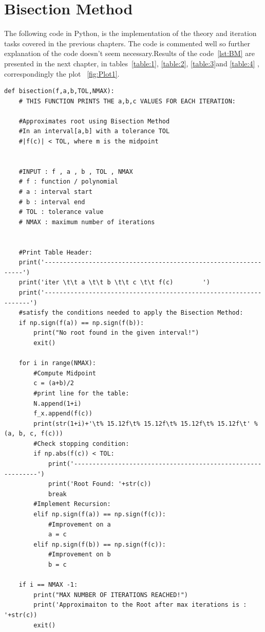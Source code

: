 \documentclass[a4paper, 12pt]{report}
\begin{document}
\section{Bisection Method}
The following code in Python, is the implementation of the theory and iteration tasks covered in the previous chapters. The code is commented well so further explanation of the code doesn't seem necessary.Results of the code~\ref{lst:BM} are presented in the next chapter, in tables~\ref{table:1}, \ref{table:2}, \ref{table:3}and \ref{table:4} , correspondingly the plot ~\ref{fig:Plot1}.
\begin{lstlisting}
def bisection(f,a,b,TOL,NMAX):
    # THIS FUNCTION PRINTS THE a,b,c VALUES FOR EACH ITERATION:
    
    #Approximates root using Bisection Method
    #In an interval[a,b] with a tolerance TOL
    #|f(c)| < TOL, where m is the midpoint
    

    #INPUT : f , a , b , TOL , NMAX
    # f : function / polynomial
    # a : interval start
    # b : interval end
    # TOL : tolerance value
    # NMAX : maximum number of iterations


    #Print Table Header:
    print('----------------------------------------------------------------')
    print('iter \t\t a \t\t b \t\t c \t\t f(c)        ')
    print('------------------------------------------------------------------')
    #satisfy the conditions needed to apply the Bisection Method:
    if np.sign(f(a)) == np.sign(f(b)):
        print("No root found in the given interval!")
        exit()
        
    for i in range(NMAX):
        #Compute Midpoint
        c = (a+b)/2
        #print line for the table:
        N.append(1+i)
        f_x.append(f(c))
        print(str(1+i)+'\t% 15.12f\t% 15.12f\t% 15.12f\t% 15.12f\t' %(a, b, c, f(c)))
        #Check stopping condition:
        if np.abs(f(c)) < TOL:
            print('------------------------------------------------------------')
            print('Root Found: '+str(c))
            break
        #Implement Recursion:
        elif np.sign(f(a)) == np.sign(f(c)):
            #Improvement on a
            a = c
        elif np.sign(f(b)) == np.sign(f(c)):
            #Improvement on b
            b = c
        
    if i == NMAX -1:
        print("MAX NUMBER OF ITERATIONS REACHED!")
        print('Approximaiton to the Root after max iterations is : '+str(c))        
        exit()
\end{lstlisting}
\end{document}
